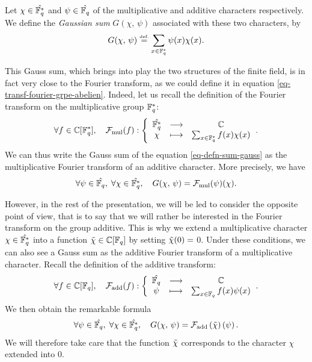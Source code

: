 \begin{defn}
\label{defn-sum-gauss}
  \label{notation-29} Let $ \chi \in \hat{\mathbb{F}_q^*} $ and $ \psi \in \hat{\mathbb{F}_q} $ of the multiplicative and additive characters respectively. We define the \textit{Gaussian sum} $ G (\chi, \, \psi) $ associated with these two characters, by
\begin{equation}
\label{eq-defn-sum-gauss}
G (\chi, \, \psi) \stackrel{\mbox{\upshape\tiny def.}}{=} \sum_{x \in \mathbb{F}_q^*}{\psi (x) \chi (x)}.
\end{equation}
\end{defn}
 \label{notation-30} This Gauss sum, which brings into play the two structures of the finite field, is in fact very close to the Fourier transform, as we could define it in equation \eqref{eq-transf-fourier-grpe-abelien}. Indeed, let us recall the definition of the Fourier transform on the multiplicative group $ \mathbb{F}_q^* $:
\begin{equation*}
\forall f \in \mathbb{C} [\mathbb{F}_q^*], \quad \mathcal{F}_{\text{mul}} (f): {\left\{ \begin{array}{ccc} \hat{\mathbb{F}_q^*} & \longrightarrow & \mathbb{C} \\ \chi & \longmapsto & \sum_{x \in \mathbb{F}_q^*}^{}f(x) \chi (x) \end{array} \right.}.
\end{equation*}
We can thus write the Gauss sum of the equation \eqref{eq-defn-sum-gauss} as the multiplicative Fourier transform of an additive character. More precisely, we have
\begin{equation*}
\forall \psi \in \hat{\mathbb{F}_q}, \; \forall \chi \in \hat{\mathbb{F}_q^*}, \quad G (\chi, \, \psi) = \mathcal{F}_{\text{mul}} (\psi) (\chi).
\end{equation*}
 
 
\label{notation-31} However, in the rest of the presentation, we will be led to consider the opposite point of view, that is to say that we will rather be interested in the Fourier transform on the group additive. This is why we extend a multiplicative character $ \chi \in \hat{\mathbb{F}_q^*} $ into a function $ \tilde{\chi} \in \mathbb{C} [\mathbb{F}_q] $ by setting $ \tilde{\chi} (0) = $ 0. Under these conditions, we can also see a Gauss sum as the additive Fourier transform of a multiplicative character. Recall the definition of the additive transform:
\begin{equation}
\label{eq-transforme-fourier-additive}
\forall f \in \mathbb{C} [\mathbb{F}_q], \quad \mathcal{F}_{\text{add}} (f): {\left\{ \begin{array}{ccc} \hat{\mathbb{F}_q} & \longrightarrow & \mathbb{C} \\ \psi & \longmapsto & \sum_{x \in \mathbb{F}_q}^{}f(x) \psi (x) \end{array} \right.}.
\end{equation}
We then obtain the remarkable formula
\begin{equation}
\label{eq-trans-fourier-add-sum-gauss}
\forall \psi \in \hat{\mathbb{F}_q}, \; \forall \chi \in \hat{\mathbb{F}_q^*}, \quad G (\chi, \, \psi) = \mathcal{F}_{\text{add}} \left(\tilde{\chi} \right) \left(\psi \right).
\end{equation}
We will therefore take care that the function $ \tilde{\chi} $ corresponds to the character $ \chi $ extended into 0.
 
